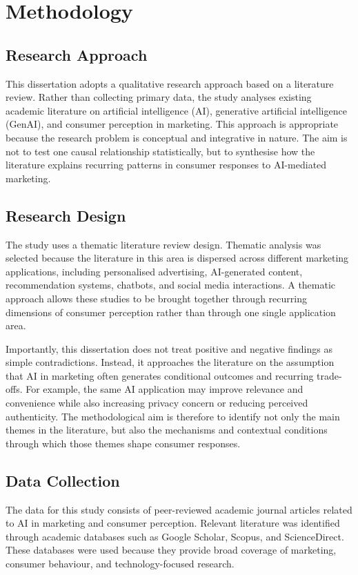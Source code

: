 \chapter{Methodology}

\section{Research Approach}
This dissertation adopts a qualitative research approach based on a literature review. Rather than collecting primary data, the study analyses existing academic literature on artificial intelligence (AI), generative artificial intelligence (GenAI), and consumer perception in marketing. This approach is appropriate because the research problem is conceptual and integrative in nature. The aim is not to test one causal relationship statistically, but to synthesise how the literature explains recurring patterns in consumer responses to AI-mediated marketing.

\section{Research Design}
The study uses a thematic literature review design. Thematic analysis was selected because the literature in this area is dispersed across different marketing applications, including personalised advertising, AI-generated content, recommendation systems, chatbots, and social media interactions. A thematic approach allows these studies to be brought together through recurring dimensions of consumer perception rather than through one single application area.

Importantly, this dissertation does not treat positive and negative findings as simple contradictions. Instead, it approaches the literature on the assumption that AI in marketing often generates conditional outcomes and recurring trade-offs. For example, the same AI application may improve relevance and convenience while also increasing privacy concern or reducing perceived authenticity. The methodological aim is therefore to identify not only the main themes in the literature, but also the mechanisms and contextual conditions through which those themes shape consumer responses.

\section{Data Collection}
The data for this study consists of peer-reviewed academic journal articles related to AI in marketing and consumer perception. Relevant literature was identified through academic databases such as Google Scholar, Scopus, and ScienceDirect. These databases were used because they provide broad coverage of marketing, consumer behaviour, and technology-focused research.


